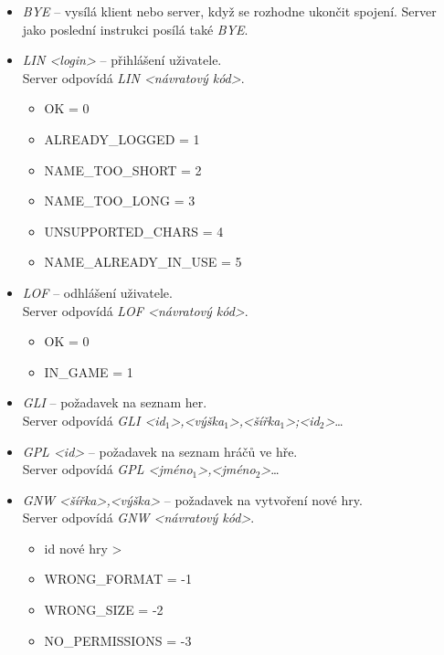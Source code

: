 \documentclass[12pt, a4paper]{report}
\begin{document}
\begin{itemize}
	\item \emph{BYE} -- vysílá klient nebo server, když se rozhodne ukončit spojení.
	Server jako poslední instrukci posílá také \emph{BYE}. 
	\item \emph{LIN {\textless}login{\textgreater}} -- přihlášení uživatele.\\
	Server odpovídá \emph{LIN {\textless}návratový kód{\textgreater}}. 
	\begin{itemize}
		\item OK = 0
		\item ALREADY\_LOGGED = 1
		\item NAME\_TOO\_SHORT = 2
		\item NAME\_TOO\_LONG = 3
		\item UNSUPPORTED\_CHARS = 4
		\item NAME\_ALREADY\_IN\_USE = 5
	\end{itemize}
	\item \emph{LOF} -- odhlášení uživatele.\\
	Server odpovídá \emph{LOF {\textless}návratový kód{\textgreater}}.
	\begin{itemize}
		\item OK = 0
		\item IN\_GAME = 1
	\end{itemize}
	\item \emph{GLI} -- požadavek na seznam her.\\
	Server odpovídá \emph{GLI {\textless}id${}_1${\textgreater},{\textless}výška${}_1${\textgreater},{\textless}šířka${}_1${\textgreater};{\textless}id${}_2${\textgreater}}\dots
	\item \emph{GPL {\textless}id{\textgreater}} -- požadavek na seznam hráčů ve hře.\\ 
	Server odpovídá \emph{GPL {\textless}jméno${}_1${\textgreater},{\textless}jméno${}_2${\textgreater}}\dots 
	\item \emph{GNW {\textless}šířka{\textgreater},{\textless}výška{\textgreater}} -- požadavek na vytvoření nové hry.\\
	Server odpovídá \emph{GNW {\textless}návratový kód{\textgreater}}.
	\begin{itemize}
		\item id nové hry \textgreater {}
		\item WRONG\_FORMAT = -1
		\item WRONG\_SIZE = -2
		\item NO\_PERMISSIONS = -3
	\end{itemize}

\end{itemize}
\end{document}
